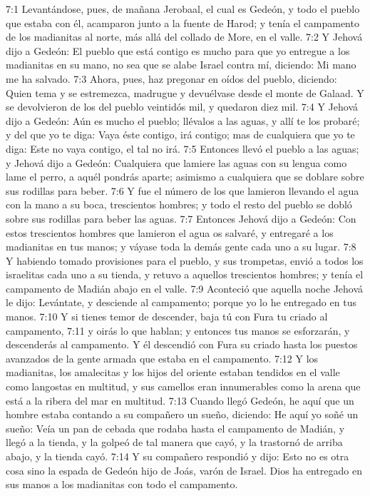 7:1 Levantándose, pues, de mañana Jerobaal, el cual es Gedeón, y todo el pueblo que estaba con él, acamparon junto a la fuente de Harod; y tenía el campamento de los madianitas al norte, más allá del collado de More, en el valle.  
7:2 Y Jehová dijo a Gedeón: El pueblo que está contigo es mucho para que yo entregue a los madianitas en su mano, no sea que se alabe Israel contra mí, diciendo: Mi mano me ha salvado.  
7:3 Ahora, pues, haz pregonar en oídos del pueblo, diciendo: Quien tema y se estremezca, madrugue y devuélvase desde el monte de Galaad. Y se devolvieron de los del pueblo veintidós mil, y quedaron diez mil.  
7:4 Y Jehová dijo a Gedeón: Aún es mucho el pueblo; llévalos a las aguas, y allí te los probaré; y del que yo te diga: Vaya éste contigo, irá contigo; mas de cualquiera que yo te diga: Este no vaya contigo, el tal no irá.  
7:5 Entonces llevó el pueblo a las aguas; y Jehová dijo a Gedeón: Cualquiera que lamiere las aguas con su lengua como lame el perro, a aquél pondrás aparte; asimismo a cualquiera que se doblare sobre sus rodillas para beber. 
7:6 Y fue el número de los que lamieron llevando el agua con la mano a su boca, trescientos hombres; y todo el resto del pueblo se dobló sobre sus rodillas para beber las aguas.  
7:7 Entonces Jehová dijo a Gedeón: Con estos trescientos hombres que lamieron el agua os salvaré, y entregaré a los madianitas en tus manos; y váyase toda la demás gente cada uno a su lugar.  
7:8 Y habiendo tomado provisiones para el pueblo, y sus trompetas, envió a todos los israelitas cada uno a su tienda, y retuvo a aquellos trescientos hombres; y tenía el campamento de Madián abajo en el valle.  
7:9 Aconteció que aquella noche Jehová le dijo: Levántate, y desciende al campamento; porque yo lo he entregado en tus manos.  
7:10 Y si tienes temor de descender, baja tú con Fura tu criado al campamento,  
7:11 y oirás lo que hablan; y entonces tus manos se esforzarán, y descenderás al campamento. Y él descendió con Fura su criado hasta los puestos avanzados de la gente armada que estaba en el campamento.  
7:12 Y los madianitas, los amalecitas y los hijos del oriente estaban tendidos en el valle como langostas en multitud, y sus camellos eran innumerables como la arena que está a la ribera del mar en multitud.  
7:13 Cuando llegó Gedeón, he aquí que un hombre estaba contando a su compañero un sueño, diciendo: He aquí yo soñé un sueño: Veía un pan de cebada que rodaba hasta el campamento de Madián, y llegó a la tienda, y la golpeó de tal manera que cayó, y la trastornó de arriba abajo, y la tienda cayó.  
7:14 Y su compañero respondió y dijo: Esto no es otra cosa sino la espada de Gedeón hijo de Joás, varón de Israel. Dios ha entregado en sus manos a los madianitas con todo el campamento.  
